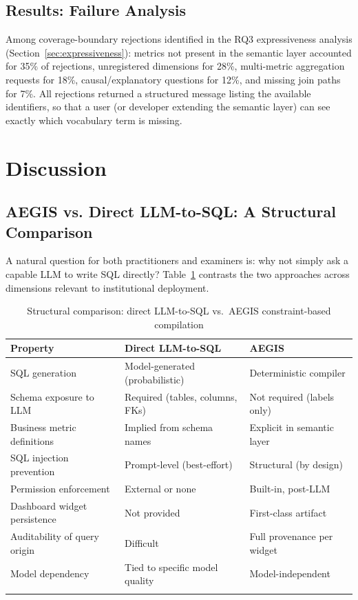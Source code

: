 \documentclass[11pt]{article}
\begin{document}
\subsection{Results: Failure Analysis}
Among coverage-boundary rejections identified in the RQ3 expressiveness analysis (Section~\ref{sec:expressiveness}): metrics not present in the semantic layer accounted for 35\% of rejections, unregistered dimensions for 28\%, multi-metric aggregation requests for 18\%, causal/explanatory questions for 12\%, and missing join paths for 7\%. All rejections returned a structured message listing the available identifiers, so that a user (or developer extending the semantic layer) can see exactly which vocabulary term is missing.

\section{Discussion}
\subsection{AEGIS vs. Direct LLM-to-SQL: A Structural Comparison}
A natural question for both practitioners and examiners is: why not simply ask a capable LLM to write SQL directly? Table~\ref{tab:comparison} contrasts the two approaches across dimensions relevant to institutional deployment.

\begin{longtable}{lll}
\toprule
\textbf{Property} & \textbf{Direct LLM-to-SQL} & \textbf{AEGIS} \\
\midrule
SQL generation & Model-generated (probabilistic) & Deterministic compiler \\
Schema exposure to LLM & Required (tables, columns, FKs) & Not required (labels only) \\
Business metric definitions & Implied from schema names & Explicit in semantic layer \\
SQL injection prevention & Prompt-level (best-effort) & Structural (by design) \\
Permission enforcement & External or none & Built-in, post-LLM \\
Dashboard widget persistence & Not provided & First-class artifact \\
Auditability of query origin & Difficult & Full provenance per widget \\
Model dependency & Tied to specific model quality & Model-independent \\
\bottomrule
\caption{Structural comparison: direct LLM-to-SQL vs.\ AEGIS constraint-based compilation}\label{tab:comparison}
\end{longtable}
\end{document}

